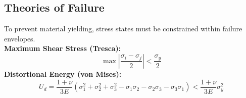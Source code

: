 \documentclass{article}
\begin{document}
\subsection{Theories of Failure}
To prevent material yielding, stress states must be constrained within failure envelopes.
\\
\textbf{Maximum Shear Stress (Tresca):}
\begin{equation}
    \max \left| \frac{\sigma_i - \sigma_j}{2} \right| < \frac{\sigma_y}{2}
\end{equation}
\textbf{Distortional Energy (von Mises):}
\begin{equation}
    U_d = \frac{1+\nu}{3E}(\sigma_1^2 + \sigma_2^2 + \sigma_3^2 - \sigma_1\sigma_2 - \sigma_2\sigma_3 - \sigma_3\sigma_1) < \frac{1+\nu}{3E}\sigma_y^2
\end{equation}
\end{document}

